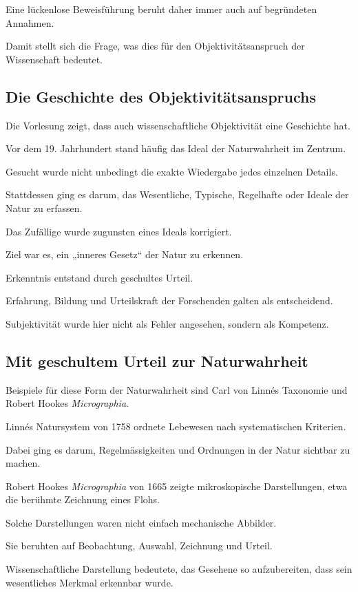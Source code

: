 Eine lückenlose Beweisführung
beruht daher immer auch
auf begründeten Annahmen.

Damit stellt sich die Frage,
was dies für den Objektivitätsanspruch
der Wissenschaft bedeutet.

\subsection{Die Geschichte des Objektivitätsanspruchs}

Die Vorlesung zeigt,
dass auch wissenschaftliche Objektivität
eine Geschichte hat.

Vor dem 19. Jahrhundert
stand häufig das Ideal der Naturwahrheit im Zentrum.

Gesucht wurde nicht unbedingt
die exakte Wiedergabe jedes einzelnen Details.

Stattdessen ging es darum,
das Wesentliche,
Typische,
Regelhafte oder Ideale der Natur zu erfassen.

Das Zufällige wurde zugunsten
eines Ideals korrigiert.

Ziel war es,
ein „inneres Gesetz“ der Natur zu erkennen.

Erkenntnis entstand durch geschultes Urteil.

Erfahrung,
Bildung
und Urteilskraft der Forschenden
galten als entscheidend.

Subjektivität wurde hier nicht als Fehler angesehen,
sondern als Kompetenz.

\subsection{Mit geschultem Urteil zur Naturwahrheit}

Beispiele für diese Form der Naturwahrheit
sind Carl von Linnés Taxonomie
und Robert Hookes \emph{Micrographia}.

Linnés Natursystem von 1758
ordnete Lebewesen nach systematischen Kriterien.

Dabei ging es darum,
Regelmässigkeiten und Ordnungen
in der Natur sichtbar zu machen.

Robert Hookes \emph{Micrographia} von 1665
zeigte mikroskopische Darstellungen,
etwa die berühmte Zeichnung eines Flohs.

Solche Darstellungen waren nicht einfach
mechanische Abbilder.

Sie beruhten auf Beobachtung,
Auswahl,
Zeichnung
und Urteil.

Wissenschaftliche Darstellung bedeutete,
das Gesehene so aufzubereiten,
dass sein wesentliches Merkmal
erkennbar wurde.

